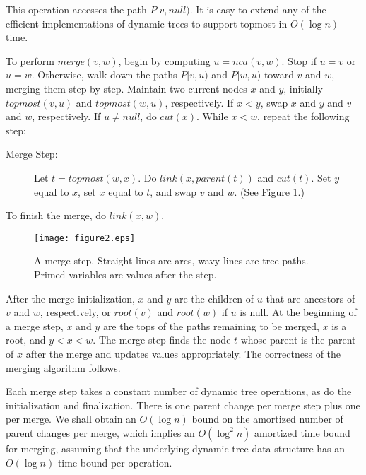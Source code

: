 \documentclass[twoside,leqno,twocolumn]{article}
\newcommand{\merge}{\mathit{merge}}
\newcommand{\nca}{\mathit{nca}}
\newcommand{\nul}{\mathit{null}}
\begin{document}
This operation accesses the path $P[v, \nul)$.  It is easy to extend any of the efficient implementations of dynamic trees to support topmost in $O(\log n)$ time.

To perform $\merge(v, w)$, begin by computing $u = \nca(v, w)$.  Stop if $u = v$ or $u = w$.  Otherwise, walk down the paths $P[v, u)$ and $P[w, u)$ toward $v$ and $w$, merging them step-by-step.  Maintain two current nodes $x$ and $y$, initially $\mathit{topmost}(v, u)$ and $\mathit{topmost}(w, u)$, respectively.  If $x < y$, swap $x$ and $y$ and $v$ and $w$, respectively.  If $u \neq \nul$, do $\mathit{cut}(x)$.  While $x < w$, repeat the following step:

\begin{description}
\item[Merge Step:] Let $t = \mathit{topmost}(w, x)$.  Do $\mathit{link}(x, \mathit{parent}(t))$ and $\mathit{cut}(t)$. Set $y$ equal to $x$, set $x$ equal to $t$, and swap $v$ and $w$. (See Figure \ref{fig:topmost}.)
\end{description}

To finish the merge, do $\mathit{link}(x, w)$.

\begin{figure}
\addtolength{\abovecaptionskip}{-.5cm}
\begin{center}
\resizebox{0.85\textwidth}{!} {\texttt{[image: figure2.eps]}}\\
\end{center}
\caption{\label{fig:topmost} A merge step. Straight lines are arcs, wavy lines are tree paths. Primed variables are values after the step.}
\end{figure}


After the merge initialization, $x$ and $y$ are the children of $u$ that are ancestors of $v$ and $w$, respectively, or $\mathit{root}(v)$ and $\mathit{root}(w)$ if $u$ is null.  At the beginning of a merge step,  $x$ and $y$ are the tops of the paths remaining to be merged, $x$ is a root, and $y < x < w$.  The merge step finds the node $t$ whose parent is the parent of $x$ after the merge and updates values appropriately.  The correctness of the merging algorithm follows.

Each merge step takes a constant number of dynamic tree operations, as do the initialization and finalization.  There is one parent change per merge step plus one per merge.  We shall obtain an $O(\log n)$ bound on the amortized number of parent changes per merge, which implies an $O(\log^2 n)$ amortized time bound for merging, assuming that the underlying dynamic tree data structure has an $O(\log n)$ time bound per operation.
\end{document}
